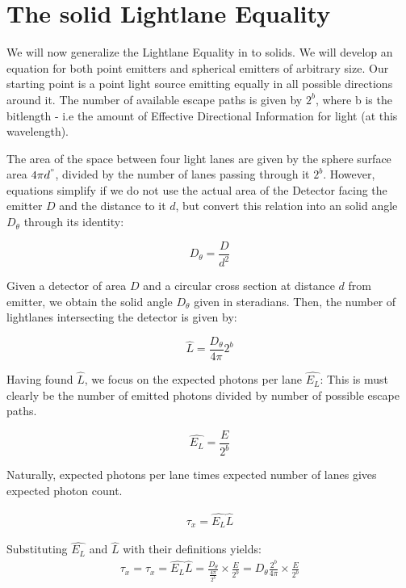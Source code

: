 \documentclass[notitlepage]{article}
\begin{document}
\section{ The solid Lightlane Equality}
We will now generalize the Lightlane Equality in \citep{RhadamantysA2} to solids. We will develop an equation for both point emitters and spherical emitters of arbitrary size. Our starting point is a point light source emitting equally in all possible directions around it. The number of available escape paths is given by $2^b$, where b is the bitlength - i.e the amount of Effective Directional Information for light (at this wavelength).

The area of the space between four light lanes are given by the sphere surface area $4\pi d^" $, divided by the number of lanes passing through it $2^b$. However, equations simplify if we do not use the actual area of the Detector facing the emitter $D$ and the distance to it $d$, but convert this relation into an solid angle $D_\theta$ through its identity:

\begin{equation}
D_\theta = \frac{D}{d^2}
 \label{eq:DThetaIdentity}
\end{equation}

Given a detector of area $D$ and a circular cross section at distance $d$ from emitter,  we obtain the solid angle $D_\theta$  given in steradians.  Then, the number of lightlanes intersecting the  detector is given by:

\begin{equation}
 \hat{L }=  \frac{D_\theta  }{4\pi}2^b
 \label{eq:expectedLaneCount}
\end{equation}

Having found $\hat{L}$, we focus on the expected photons per lane  $\hat{E_L}$: This is must clearly be the number of emitted photons divided by number of possible escape paths.

\begin{equation}
 \hat{ E_L }= \frac{E}{2^b} 
\label{eq:expectedPhotonPerLane}
\end{equation}

Naturally, expected photons per lane times expected number of lanes gives expected photon count. 

\begin{align}
\label{xyston-E_LL}
 \tau_x = \hat{E_L} \hat{L}
\end{align}

Substituting $\hat{E_L}$ and $\hat{L}$ with their definitions yields:
\begin{align}
\label{xyston-tau}
\tau_x = \tau_x = \hat{E_L} \hat{L} = \frac{D_\theta}{\frac{4 \pi }{2^b}}  \times \frac{E}{2^b} = D_\theta \frac{2^b}{4 \pi }  \times \frac{E}{2^b} 
\end{align}
\end{document}
